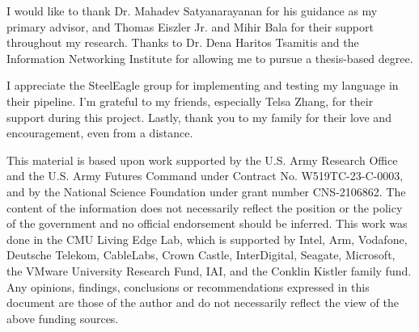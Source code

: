 \acknowledgements

\setcounter{page}{2}

I would like to thank Dr. Mahadev Satyanarayanan for his guidance as my primary advisor, and Thomas Eiszler Jr. and Mihir Bala for their support throughout my research. Thanks to Dr. Dena Haritos Tsamitis and the Information Networking Institute for allowing me to pursue a thesis-based degree.

I appreciate the SteelEagle group for implementing and testing my language in their pipeline. I'm grateful to my friends, especially Telsa Zhang, for their support during this project. Lastly, thank you to my family for their love and encouragement, even from a distance.

This material is based upon work supported by the U.S. Army Research Office and the U.S. Army Futures Command under Contract No. W519TC-23-C-0003, and by the National Science Foundation under grant number CNS-2106862. The content of the  information does not necessarily reflect the position or the policy of the government and no official endorsement should be inferred.
This work was done in the CMU Living Edge Lab, which is supported by Intel, Arm, Vodafone, Deutsche Telekom, CableLabs, Crown Castle, InterDigital, Seagate, Microsoft, the VMware University Research Fund, IAI, and the Conklin Kistler family fund. Any opinions, findings, conclusions or recommendations expressed in this document are those of the author and do not necessarily reflect the view of the above funding sources.